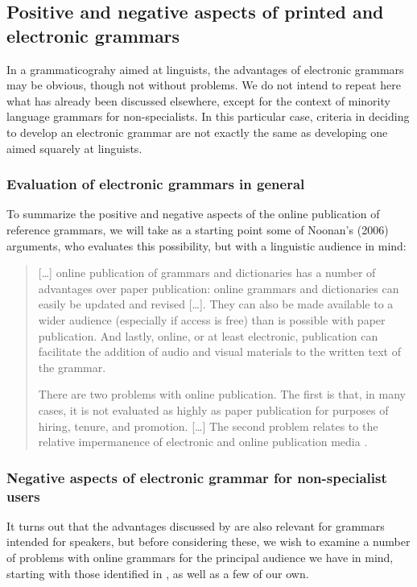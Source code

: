 \subsection{Positive and negative aspects of printed and electronic grammars}
In a grammaticograhy aimed at linguists, the advantages of electronic grammars may be obvious, though not without problems. We do not intend to repeat here what has already been discussed elsewhere, except for the context of minority language grammars for non-specialists. In this particular case, criteria in deciding to develop an electronic grammar are not exactly the same as developing one aimed squarely at linguists.

\subsubsection{Evaluation of electronic grammars in general}
To summarize the positive and negative aspects of the online publication of reference grammars, we will take as a starting point some of Noonan's (2006) arguments, who evaluates this possibility, but with a linguistic audience in mind: 

\begin{quote}
 [{\dots}] online publication of grammars and dictionaries has a number of advantages over paper publication: online grammars and dictionaries can easily be updated and revised [{\dots}]. They can also be made available to a wider audience (especially if access is free) than is possible with paper publication. And lastly, online, or at least electronic, publication can facilitate the addition of audio and visual materials to the written text of the grammar. 

 There are two problems with online publication. The first is that, in many cases, it is not evaluated as highly as paper publication for purposes of hiring, tenure, and promotion. [{\dots}] The second problem relates to the relative impermanence of electronic and online publication media \citep[364]{Noonan2006}.
\end{quote}

\subsubsection{Negative aspects of electronic grammar for non-specialist users} 
It turns out that the advantages discussed by \citet{Noonan2006} are also relevant for grammars intended for speakers, but before considering these, we wish to examine a number of problems with online grammars for the principal audience we have in mind, starting with those identified in  \citet{Noonan2006}, as well as a few of our own.

